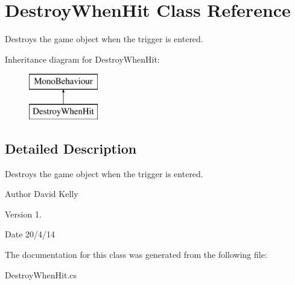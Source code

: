 \hypertarget{class_destroy_when_hit}{\section{Destroy\-When\-Hit Class Reference}
\label{class_destroy_when_hit}
}


Destroys the game object when the trigger is entered.  


Inheritance diagram for Destroy\-When\-Hit\-:\begin{figure}[H]
\begin{center}
\leavevmode
\includegraphics[height=2.000000cm]{class_destroy_when_hit}
\end{center}
\end{figure}


\subsection{Detailed Description}
Destroys the game object when the trigger is entered. 

\begin{DoxyAuthor}{Author}
David Kelly 
\end{DoxyAuthor}
\begin{DoxyVersion}{Version}
1. 
\end{DoxyVersion}
\begin{DoxyDate}{Date}
20/4/14 
\end{DoxyDate}


The documentation for this class was generated from the following file\-:\begin{DoxyCompactItemize}
\item 
Destroy\-When\-Hit.\-cs\end{DoxyCompactItemize}
